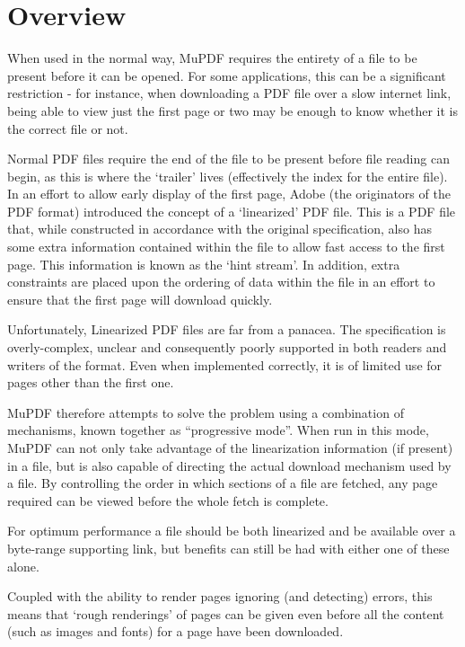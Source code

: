 \documentclass[oneside]{book}
\begin{document}
\section{Overview}

When used in the normal way, MuPDF requires the entirety of a file to be present before it can be opened. For some applications, this can be a significant restriction - for instance, when downloading a PDF file over a slow internet link, being able to view just the first page or two may be enough to know whether it is the correct file or not.

Normal PDF files require the end of the file to be present before file reading can begin, as this is where the `trailer' lives (effectively the index for the entire file). In an effort to allow early display of the first page, Adobe (the originators of the PDF format) introduced the concept of a `linearized' PDF file. This is a PDF file that, while constructed in accordance with the original specification, also has some extra information contained within the file to allow fast access to the first page. This information is known as the `hint stream'. In addition, extra constraints are placed upon the ordering of data within the file in an effort to ensure that the first page will download quickly.

Unfortunately, Linearized PDF files are far from a panacea. The specification is overly-complex, unclear and consequently poorly supported in both readers and writers of the format. Even when implemented correctly, it is of limited use for pages other than the first one.

MuPDF therefore attempts to solve the problem using a combination of mechanisms, known together as ``progressive mode''. When run in this mode, MuPDF can not only take advantage of the linearization information (if present) in a file, but is also capable of directing the actual download mechanism used by a file. By controlling the order in which sections of a file are fetched, any page required can be viewed before the whole fetch is complete.

For optimum performance a file should be both linearized and be
available over a byte-range supporting link, but benefits can still
be had with either one of these alone.

Coupled with the ability to render pages ignoring (and detecting) errors, this means that `rough renderings' of pages can be given even before all the content (such as images and fonts) for a page have been downloaded.
\end{document}
